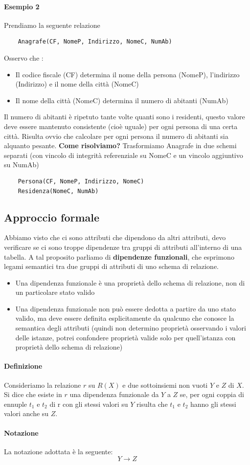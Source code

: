 \paragraph{Esempio 2} Prendiamo la seguente relazione
\begin{verbatim}
	Anagrafe(CF, NomeP, Indirizzo, NomeC, NumAb)
\end{verbatim}
Osservo che :
\begin{itemize}
	\item Il codice fiscale (CF) determina il nome della persona (NomeP), l'indirizzo (Indirizzo) e il nome della città (NomeC)
	\item Il nome della città (NomeC) determina il numero di abitanti (NumAb)
\end{itemize}
Il numero di abitanti è ripetuto tante volte quanti sono i residenti, questo valore deve essere mantenuto consistente (cioè uguale) per ogni persona di una certa città. Risulta ovvio che calcolare per ogni persona il numero di abitanti sia alquanto pesante. \textbf{Come risolviamo?} Trasformiamo Anagrafe in due schemi separati (con vincolo di integrità referenziale su NomeC e un vincolo aggiuntivo su NumAb)
\begin{verbatim}
	Persona(CF, NomeP, Indirizzo, NomeC)
	Residenza(NomeC, NumAb)
\end{verbatim}
\subsection{Approccio formale} 
Abbiamo visto che ci sono attributi che dipendono da altri attributi, devo verificare se ci sono troppe dipendenze tra gruppi di attributi all'interno di una tabella. A tal proposito parliamo di \textbf{dipendenze funzionali}, che esprimono legami semantici tra due gruppi di attributi di uno schema di relazione.
\begin{itemize}
	\item Una dipendenza funzionale è una proprietà dello schema di relazione, non di un particolare stato valido
	\item Una dipendenza funzionale non può essere dedotta a partire da uno stato valido, ma deve essere definita esplicitamente da qualcuno che conosce la semantica degli attributi (quindi non determino proprietà osservando i valori delle istanze, potrei confondere proprietà valide solo per quell'istanza con proprietà dello schema di relazione)
\end{itemize}
\paragraph{Definizione} Consideriamo la relazione $r$ su $R(X)$ e due sottoinsiemi non vuoti $Y$ e $Z$ di $X$. Si dice che esiste in $r$ una dipendenza funzionale da $Y$ a $Z$ se, per ogni coppia di ennuple $t_1$ e $t_2$ di r con gli stessi valori su $Y$ risulta che $t_1$ e $t_2$ hanno gli stessi valori anche su $Z$. \paragraph{Notazione} La notazione adottata è la seguente:
\[Y \longrightarrow Z\]
